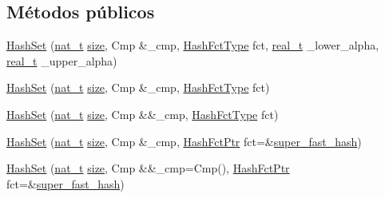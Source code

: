 \subsection*{Métodos públicos}
\begin{DoxyCompactItemize}
\item 
\hyperlink{class_designar_1_1_hash_set_afb5e932ee4dcc9b1dec4d6eefd810c32}{Hash\+Set} (\hyperlink{namespace_designar_aa72662848b9f4815e7bf31a7cf3e33d1}{nat\+\_\+t} \hyperlink{class_designar_1_1_hash_set_a0026e1b2caf94d25b554cd6a399f691f}{size}, Cmp \&\+\_\+cmp, \hyperlink{class_designar_1_1_hash_set_a05d8d111665c25bc17290c01fa299398}{Hash\+Fct\+Type} fct, \hyperlink{namespace_designar_aca2c32af26808dbec1f3a3071fad25ce}{real\+\_\+t} \+\_\+lower\+\_\+alpha, \hyperlink{namespace_designar_aca2c32af26808dbec1f3a3071fad25ce}{real\+\_\+t} \+\_\+upper\+\_\+alpha)
\item 
\hyperlink{class_designar_1_1_hash_set_a6f60ca18ef5bcf8560b9827ca9678e58}{Hash\+Set} (\hyperlink{namespace_designar_aa72662848b9f4815e7bf31a7cf3e33d1}{nat\+\_\+t} \hyperlink{class_designar_1_1_hash_set_a0026e1b2caf94d25b554cd6a399f691f}{size}, Cmp \&\+\_\+cmp, \hyperlink{class_designar_1_1_hash_set_a05d8d111665c25bc17290c01fa299398}{Hash\+Fct\+Type} fct)
\item 
\hyperlink{class_designar_1_1_hash_set_aa57bbddb93c59eda7551cf9cf6b9220e}{Hash\+Set} (\hyperlink{namespace_designar_aa72662848b9f4815e7bf31a7cf3e33d1}{nat\+\_\+t} \hyperlink{class_designar_1_1_hash_set_a0026e1b2caf94d25b554cd6a399f691f}{size}, Cmp \&\&\+\_\+cmp, \hyperlink{class_designar_1_1_hash_set_a05d8d111665c25bc17290c01fa299398}{Hash\+Fct\+Type} fct)
\item 
\hyperlink{class_designar_1_1_hash_set_ac9204afce59af28d1360c50f11b5694e}{Hash\+Set} (\hyperlink{namespace_designar_aa72662848b9f4815e7bf31a7cf3e33d1}{nat\+\_\+t} \hyperlink{class_designar_1_1_hash_set_a0026e1b2caf94d25b554cd6a399f691f}{size}, Cmp \&\+\_\+cmp, \hyperlink{class_designar_1_1_hash_set_a7a8b0a4970519ebc9ccc1ad247d0639f}{Hash\+Fct\+Ptr} fct=\&\hyperlink{namespace_designar_afd5712d16b3ae1c1c7d59f1004cd96fd}{super\+\_\+fast\+\_\+hash})
\item 
\hyperlink{class_designar_1_1_hash_set_a007cbe70f94c249ccebaf68006bbf0f4}{Hash\+Set} (\hyperlink{namespace_designar_aa72662848b9f4815e7bf31a7cf3e33d1}{nat\+\_\+t} \hyperlink{class_designar_1_1_hash_set_a0026e1b2caf94d25b554cd6a399f691f}{size}, Cmp \&\&\+\_\+cmp=Cmp(), \hyperlink{class_designar_1_1_hash_set_a7a8b0a4970519ebc9ccc1ad247d0639f}{Hash\+Fct\+Ptr} fct=\&\hyperlink{namespace_designar_afd5712d16b3ae1c1c7d59f1004cd96fd}{super\+\_\+fast\+\_\+hash})

\end{DoxyCompactItemize}
